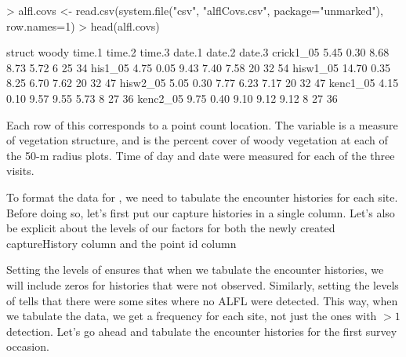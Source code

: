 \documentclass[a4paper]{article}
\renewenvironment{Schunk}{\vspace{\topsep}}{\vspace{\topsep}}
\begin{document}
\begin{Schunk}
\begin{Sinput}
> alfl.covs <- read.csv(system.file("csv", "alflCovs.csv", package="unmarked"),
                          row.names=1)
> head(alfl.covs)
\end{Sinput}
\begin{Soutput}
          struct woody time.1 time.2 time.3 date.1 date.2 date.3
crick1_05   5.45  0.30   8.68   8.73   5.72      6     25     34
his1_05     4.75  0.05   9.43   7.40   7.58     20     32     54
hisw1_05   14.70  0.35   8.25   6.70   7.62     20     32     47
hisw2_05    5.05  0.30   7.77   6.23   7.17     20     32     47
kenc1_05    4.15  0.10   9.57   9.55   5.73      8     27     36
kenc2_05    9.75  0.40   9.10   9.12   9.12      8     27     36
\end{Soutput}
\end{Schunk}

Each row of this  corresponds to a point count
location. The variable  is a measure of vegetation
structure, and  is the percent cover of woody vegetation
at each of the 50-m radius plots. Time of day and date were measured
for each of the three visits.

To format the data for , we need to tabulate the
encounter histories for each site. Before doing so, let's first put
our capture histories in a single column. Let's also be explicit about
the levels of our factors for both the newly created captureHistory
column and the point id column

\begin{Schunk}
\end{Schunk}

Setting the levels of  ensures that when we
tabulate the encounter histories, we will include zeros for histories
that were not observed. Similarly, setting the levels of
 tells  that there
were some sites where no ALFL were detected. This way, when we
tabulate the data, we get a frequency for each site, not just the ones
with $>1$ detection. Let's go ahead and tabulate the encounter
histories for the first survey occasion.
\end{document}
